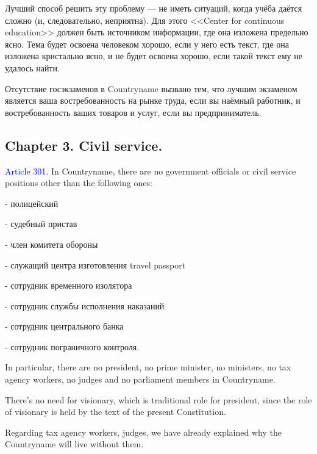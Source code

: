 \documentclass[11pt]{article}
\theoremstyle{remark}
\theoremstyle{definition}
\begin{document}
Лучший способ решить эту проблему --- не иметь ситуаций, когда учёба даётся сложно (и, следовательно, неприятна). Для этого <<Center for continuous education>> должен быть источником информации, где она изложена предельно ясно. Тема будет освоена человеком хорошо, если у него есть текст, где она изложена кристально ясно, и не будет освоена хорошо, если такой текст ему не удалось найти.








Отсутствие госэкзаменов в Countryname вызвано тем, что лучшим экзаменом является ваша востребованность на рынке труда, если вы наёмный работник, и востребованность ваших товаров и услуг, если вы предприниматель.








\color{black}



\subsection*{Chapter 3. Civil service.}




\textcolor{blue}{Article 301.} In Countryname, there are no government officials or civil service positions other than the following ones:

- полицейский

- судебный пристав

- член комитета обороны

- служащий центра изготовления travel passport

- сотрудник временного изолятора

- сотрудник службы исполнения наказаний

- сотрудник центрального банка

- сотрудник пограничного контроля.


In particular, there are no president, no prime minister, no ministers, no tax agency workers, no judges and no parliament members in Countryname.




\color{blue}



There's no need for visionary, which is traditional role for president, since the role of visionary is held by the text of the present Constitution.

Regarding tax agency workers, judges, we have already explained why the Countryname will live without them.
\end{document}
